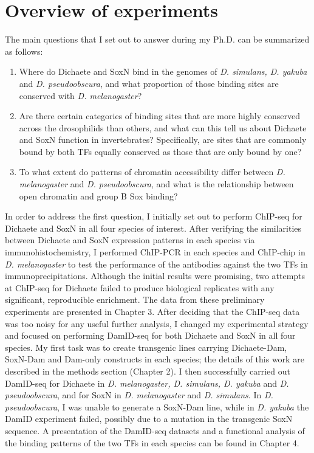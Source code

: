 \section{Overview of experiments}
The main questions that I set out to answer during my Ph.D. can be summarized as follows:
\begin{enumerate}
	\item Where do Dichaete and SoxN bind in the genomes of \emph{D. simulans, D. yakuba} and \emph{D. pseudoobscura}, and what proportion of those binding sites are conserved with \emph{D. melanogaster}?
	\item Are there certain categories of binding sites that are more highly conserved across the drosophilids than others, and what can this tell us about Dichaete and SoxN function in invertebrates? Specifically, are sites that are commonly bound by both TFs equally conserved as those that are only bound by one?
	\item To what extent do patterns of chromatin accessibility differ between \emph{D. melanogaster} and \emph{D. pseudoobscura}, and what is the relationship between open chromatin and group B Sox binding?
\end{enumerate}

In order to address the first question, I initially set out to perform ChIP-seq for Dichaete and SoxN in all four species of interest. After verifying the similarities between Dichaete and SoxN expression patterns in each species via immunohistochemistry, I performed ChIP-PCR in each species and ChIP-chip in \emph{D. melanogaster} to test the performance of the antibodies against the two TFs in immunoprecipitations. Although the initial results were promising, two attempts at ChIP-seq for Dichaete failed to produce biological replicates with any significant, reproducible enrichment. The data from these preliminary experiments are presented in Chapter 3. After deciding that the ChIP-seq data was too noisy for any useful further analysis, I changed my experimental strategy and focused on performing DamID-seq for both Dichaete and SoxN in all four species. My first task was to create transgenic lines carrying Dichaete-Dam, SoxN-Dam and Dam-only constructs in each species; the details of this work are described in the methods section (Chapter 2). I then successfully carried out DamID-seq for Dichaete in \emph{D. melanogaster, D. simulans, D. yakuba} and \emph{D. pseudoobscura}, and for SoxN in \emph{D. melanogaster} and \emph{D. simulans}. In \emph{D. pseudoobscura}, I was unable to generate a SoxN-Dam line, while in \emph{D. yakuba} the DamID experiment failed, possibly due to a mutation in the transgenic SoxN sequence. A presentation of the DamID-seq datasets and a functional analysis of the binding patterns of the two TFs in each species can be found in Chapter 4.\\

